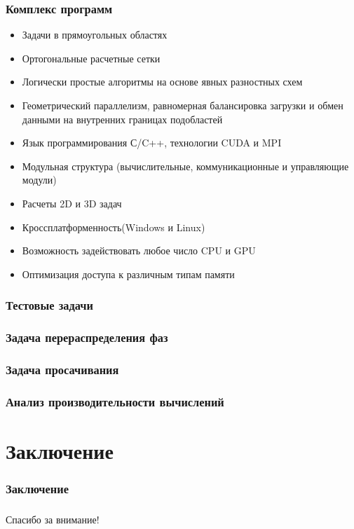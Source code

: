 \documentclass[10pt,pdf,hyperref={unicode}]{beamer} %
\begin{document}
\begin{frame}
\begin{center}
\frametitle{Комплекс программ}
\begin{itemize}
\item Задачи в прямоугольных областях
\item Ортогональные расчетные сетки
\item Логически простые алгоритмы на основе явных разностных схем
\item Геометрический параллелизм, равномерная балансировка загрузки и обмен данными на внутренних границах подобластей
\item Язык программирования С/C++, технологии CUDA и MPI
\item Модульная структура (вычислительные, коммуникационные и управляющие модули)
\item Расчеты 2D и 3D задач
\item Кроссплатформенность(Windows и Linux)
\item Возможность задействовать любое число CPU и GPU
\item Оптимизация доступа к различным типам памяти
\end{itemize}
\end{center}
\end{frame}

\begin{frame}
\begin{center}
\frametitle{Тестовые задачи}

\end{center}
\end{frame}

\begin{frame}
\frametitle{Задача перераспределения фаз}
\begin{center}

\end{center}
\end{frame}


\begin{frame}
\frametitle{Задача просачивания}
\begin{center}

\end{center}
\end{frame}

\begin{frame}
\begin{center}
\frametitle{Анализ производительности вычислений}

\end{center}
\end{frame}

\section{Заключение}
\begin{frame}
\begin{center}
\frametitle{Заключение}

\end{center}
\end{frame}

\begin{frame}
\begin{center}
\frametitle{}
\item {\huge Спасибо за внимание!}
\end{center}
\end{frame}
\end{document}
